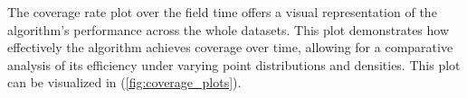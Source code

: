 


\vspace*{6mm} 


The coverage rate plot over the field time offers a visual representation of the algorithm's performance across the whole datasets. This plot demonstrates how effectively the algorithm achieves coverage over time, allowing for a comparative analysis of its efficiency under varying point distributions and densities. This plot can be visualized in (\autoref{fig:coverage_plots}).   


